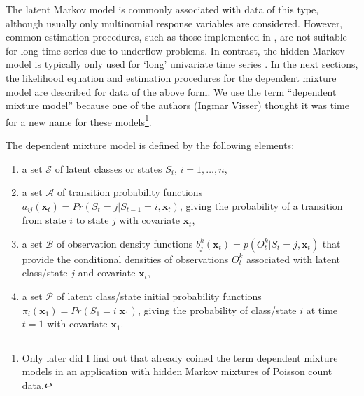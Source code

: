 \documentclass[article]{jss}
\newcommand{\vc}{\mathbf}
\newcommand{\mat}{\mathbf}
\begin{document}
The latent Markov model is commonly associated with data of this type,
although usually only multinomial response variables are considered.  However, 
common estimation procedures, such as those implemented in
\citet{Pol1996}, are not suitable for long time series due to underflow
problems.  In contrast, the hidden Markov model is typically only used
for `long' univariate time series 
\citep[][, chapter~1]{Cappe2005}.  
In the next sections, the
likelihood equation and estimation procedures for the dependent mixture model 
are described for data of the above form. We use the term
``dependent mixture model'' because one of the authors (Ingmar Visser)
thought it was time for a new name for these models\footnote{Only
later did I find out that \citet{Leroux1992} already coined the term
dependent mixture models in an application with hidden Markov mixtures
of Poisson count data.}.

The dependent mixture model is defined by the following elements:
\begin{enumerate}
	
	\item a set $\mathcal{S}$ of latent classes or states $S_{i},\, i=1,
	\ldots , n$,
	
	
	\item a set $\mathcal{A}$ of transition probability functions $a_{ij}(\vc{x}_t) = 
	Pr(S_t=j|S_{t-1}=i,\vc{x}_t)$, giving the probability of a transition from state 
	$i$ to state $j$ with covariate $\vc{x}_t$,
	
	\item a set $\mathcal{B}$ of observation density functions $b_j^k(\vc{x}_t) = p(O_{t}^k|S_t = j, \vc{x}_t)$ that
	provide the conditional densities of observations $O_{t}^k$ 
	associated with latent class/state $j$ and covariate $\vc{x}_t$,
	
	\item a set $\mathcal{P}$ of latent class/state initial probability functions
	$\pi_{i}(\vc{x}_1) = Pr(S_1 = i|\vc{x}_1)$, giving the probability of class/state
	$i$ at time $t=1$ with covariate $\vc{x}_1$.
	
\end{enumerate}
\end{document}

